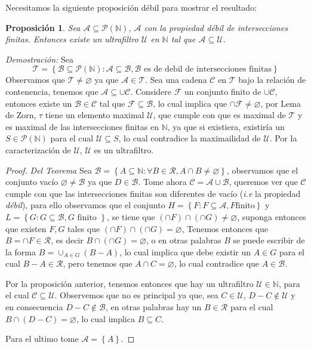 \documentclass[11pt,a4paper,draft]{article}
\newtheorem{prop}{Proposición}
\newcommand{\set}[1]{\left\lbrace #1 \right\rbrace}
\begin{document}
Necesitamos la siguiente proposición débil para mostrar el resultado:

\begin{prop}
	Sea $ \mathcal{A} \subseteq \mathcal{P}(\mathbb{N}) $, $ \mathcal{A} $ con la propiedad débil de intersecciones finitas. Entonces existe un ultrafiltro $ \mathcal{U} $ en $ \mathbb{N} $ tal que $ \mathcal{A} \subseteq \mathcal{U} $.
\end{prop}

\textit{Demostración: } Sea \[ \mathcal{T} = \set{\mathcal{B} \subseteq \mathcal{P}(\mathbb{N}):\mathcal{A} \subseteq \mathcal{B}, \mathcal{B} \textrm{ es de debil de intersecciones finitas}} \]
Observamos que $ \mathcal{T} \neq \varnothing $ ya que $ \mathcal{A} \in \mathcal{T} $. Sea una cadena $ \mathcal{C} $ en $ \mathcal{T} $ bajo la relación de contenencia, tenemos que $ \mathcal{A} \subseteq \cup \mathcal{C} $. Considere $\mathcal{F}$ un conjunto finito de $ \cup \mathcal{C} $, entonces existe un $ \mathcal{B} \in \mathcal{C} $ tal que $ \mathcal{F} \subseteq \mathcal{B} $, lo cual implica que $ \cap \mathcal{F} \neq \varnothing $, por Lema de Zorn, $ \mathcal{\tau} $ tiene un elemento maximal $ \mathcal{U} $, que cumple con que es maximal de $ \mathcal{T} $ y es maximal de las intersecciones finitas en $ \mathbb{N} $, ya que si existiera, existiría un $ S \in \mathcal{P}(\mathbb{N}) $ para el cual $  \mathcal{U} \subseteq S $, lo cual contradice la maximailidad de $ \mathcal{U} $. Por la caracterización de $ \mathcal{U} $, $ \mathcal{U} $ es un ultrafiltro.
\begin{proof}
	\textit{Del Teorema} Sea $ \mathcal{B} = \set{A \subseteq \mathbb{N}: \forall B \in \mathcal{R}, A \cap B \neq \varnothing } $, observamos que el conjunto vacío $ \varnothing \neq \mathcal{B} $ ya que $ D \in \mathcal{B} $. Tome ahora $ \mathcal{C} = \mathcal{A} \cup \mathcal{B} $, queremos ver que $ \mathcal{C} $ cumple con que las intersecciones finitas son diferentes de vacío (\emph{i.e} la propiedad \emph{débil}), para ello observamos que el conjunto $ H = \set{F : F \subseteq \mathcal{A}, F \textrm{finito}} $ y $ L = \set{G : G \subseteq \mathcal{B}, G \textrm{ finito }} $, se tiene que $ (\cap F) \cap (\cap G) \neq \varnothing $, suponga entonces que existen $ F,G $ tales que $ (\cap F) \cap (\cap G) = \varnothing  $, Tenemos entonces que  $ B = \cap F \in \mathcal{R}  $, es decir $ B \cap (\cap G) = \varnothing $, o en otras palabras $B$ se puede escribir de la forma $ B = \cup_{A \in G}(B - A) $, lo cual implica que debe existir un $ A \in G  $ para el cual $ B - A \in \mathcal{R} $, pero tenemos que $ A \cap C = \varnothing  $, lo cual contradice que $  A \in \mathcal{B} $.
	
	 Por la proposición anterior, tenemos entonces que hay un ultrafiltro $ \mathcal{U} \in \mathbb{N} $, para el cual $ \mathcal{C} \subseteq \mathcal{U} $. Observemos que no es principal ya que, sea $ C \in \mathcal{U} $, $ D - C \notin \mathcal{U} $ y en consecuencia $ D - C \notin  \mathcal{B}$, en otras palabras hay un $ B \in \mathcal{R} $ para el cual  $ B \cap (D - C) = \varnothing  $, lo cual implica $ B \subseteq C $.
	 
	 Para el ultimo tome $ \mathcal{A} = \set{A} $.
\end{proof}
\end{document}
